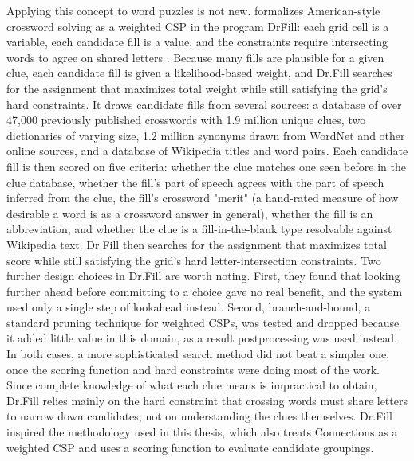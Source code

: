 Applying this concept to word puzzles is not new. \citeauthor{ginsbergDrFillCrosswordsImplemented2014} formalizes American-style crossword solving as a weighted \ac{CSP} in the program Dr\.Fill: each grid cell is a variable, each candidate fill is a value, and the constraints require intersecting words to agree on shared letters \cite{ginsbergDrFillCrosswordsImplemented2014}. Because many fills are plausible for a given clue, each candidate fill is given a likelihood-based weight, and Dr.Fill searches for the assignment that maximizes total weight while still satisfying the grid's hard constraints. It draws candidate fills from several sources: a database of over 47,000 previously published crosswords with 1.9 million unique clues, two dictionaries of varying size, 1.2 million synonyms drawn from WordNet and other online sources, and a database of Wikipedia titles and word pairs. Each candidate fill is then scored on five criteria: whether the clue matches one seen before in the clue database, whether the fill's part of speech agrees with the part of speech inferred from the clue, the fill's crossword "merit" (a hand-rated measure of how desirable a word is as a crossword answer in general), whether the fill is an abbreviation, and whether the clue is a fill-in-the-blank type resolvable against Wikipedia text. 
Dr.Fill then searches for the assignment that maximizes total score while still satisfying the grid's hard letter-intersection constraints. Two further design choices in Dr.Fill are worth noting. First, they found that looking further ahead before committing to a choice gave no real benefit, and the system used only a single step of lookahead instead. Second, branch-and-bound, a standard pruning technique for weighted CSPs, was tested and dropped because it added little value in this domain, as a result postprocessing was used instead. In both cases, a more sophisticated search method did not beat a simpler one, once the scoring function and hard constraints were doing most of the work. Since complete knowledge of what each clue means is impractical to obtain, Dr.Fill relies mainly on the hard constraint that crossing words must share letters to narrow down candidates, not on understanding the clues themselves. Dr.Fill inspired the methodology used in this thesis, which also treats Connections as a weighted \ac{CSP} and uses a scoring function to evaluate candidate groupings.

